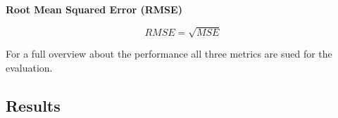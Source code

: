 \textbf{Root Mean Squared Error (RMSE)}

\begin{tcolorbox}[arc=0pt,boxrule=0.5pt]
    \begin{equation}
        \label{eq:rmse}
        RMSE = \sqrt{MSE}
    \end{equation}
\end{tcolorbox}

For a full overview about the performance all three metrics are sued for the
evaluation.




\subsection{Results}\label{subsec:results}



